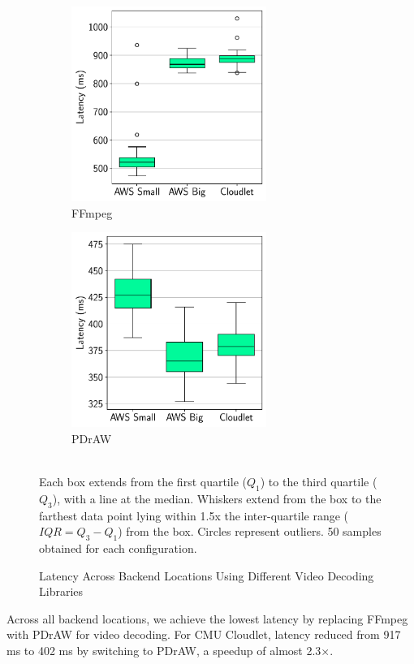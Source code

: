 \begin{figure}[htbp]
    \centering
    \begin{subfigure}[t]{0.45\textwidth}
        \centering
        \includegraphics[height=2.5in]{figs/ffmpeg_box_plot.pdf}
        \caption{FFmpeg}
        \label{fig:ffmpeg_box_plot}
    \end{subfigure}
    \begin{subfigure}[t]{0.45\textwidth}
        \centering
        \includegraphics[height=2.5in]{figs/pdraw_box_plot.pdf}
        \caption{PDrAW}
        \label{fig:pdraw_box_plot}
    \end{subfigure}\vspace{1mm}\\
        \footnotesize{Each box extends from the first quartile ($Q_1$) to the third quartile ($Q_3$), with a line at the median. Whiskers extend from the box to the farthest data point lying within 1.5x the inter-quartile range ($IQR = Q_3-Q_1$) from the box. Circles represent outliers. 50 samples obtained for each configuration.}
    \caption{Latency Across Backend Locations Using Different Video Decoding Libraries}
    \label{fig:box_plots}
\end{figure}

Across all backend locations, we achieve the lowest latency by replacing FFmpeg
with PDrAW for video decoding.  For CMU Cloudlet, latency reduced
from 917 ms to 402 ms by switching to PDrAW, a speedup of almost 2.3$\times$.

